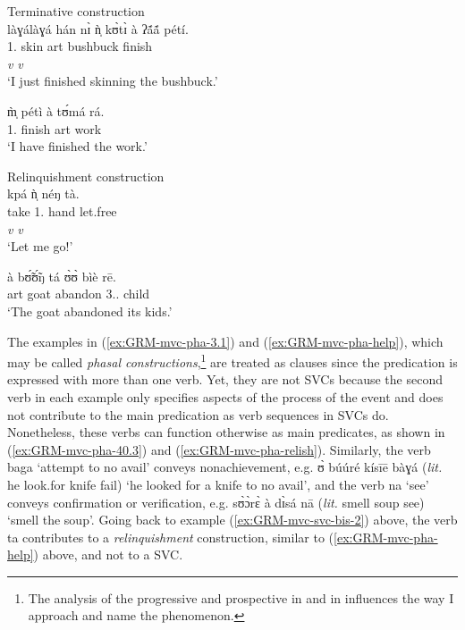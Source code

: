 \ea\label{ex:GRM-mvc-phase}

\ea\label{ex:GRM-mvc-pha-3.1} {\rm Terminative construction}\\
\glll làɣálàɣá hán nɪ̀ ǹ̩ kʊ̀tɪ̀ à ʔã́ã́ pétí.\\
{\ideo} {\dem} {\postp} {1.\sg} {skin} {\sc art} bushbuck  finish\\
{} {} {} {}  {\it v} {} {} {\it v}\\
\glt `I  just finished skinning the bushbuck.'

\ex\label{ex:GRM-mvc-pha-40.3}
\gll  m̩̀ pétì à tʊ́má rá.\\
{1.\sg} finish {\sc art} work {\foc}\\
\glt `I have finished the work.'


\ex\label{ex:GRM-mvc-pha-help}{\rm Relinquishment construction}\\
\glll  kpá ǹ̩ néŋ tà.\\
take {1.\sg} hand let.free\\
 {\it v} {}  {} {\it v}\\
\glt `Let me go!'

\ex\label{ex:GRM-mvc-pha-relish} 
\gll  à bʊ̃́ʊ̃́ŋ tá ʊ̀ʊ̀ bìè rē.\\
{\sc art} goat abandon {3.\sg.\poss} child {\foc}\\
\glt `The goat abandoned its kids.'

\z 
 \z

The examples  in (\ref{ex:GRM-mvc-pha-3.1}) and (\ref{ex:GRM-mvc-pha-help}),
which may be called  {\it phasal  constructions},\footnote{The analysis of the
progressive and prospective in  and  in \citet{Amek08} influences the
way I approach and name the phenomenon.}  are treated as  clauses
since the predication is expressed with more than one verb. Yet, they are not
SVCs because the second verb in each example only specifies aspects of the
process
of the event  and does not contribute to the main predication as verb sequences
in SVCs do. Nonetheless, these verbs can function otherwise as main predicates,
as shown in (\ref{ex:GRM-mvc-pha-40.3}) and (\ref{ex:GRM-mvc-pha-relish}).
Similarly, the verb {\sls baga} `attempt to no avail'  conveys
nonachievement, e.g. {\sls ʊ̀ búúré kísīē bàɣá} ({\it lit.} he look.for knife 
fail) 
`he looked for a knife to no avail',  and the verb {\sls na} `see' conveys confirmation 
or
verification, e.g. {\sls sʊ̀ɔ̀rɛ̀ à dɪ̀sá nā} ({\it lit.} smell soup see) `smell the
soup'. Going back to example (\ref{ex:GRM-mvc-svc-bis-2}) above, the verb {\sls ta}
contributes to a {\it relinquishment}  construction, similar to
(\ref{ex:GRM-mvc-pha-help}) above, and not to a SVC. 
 
